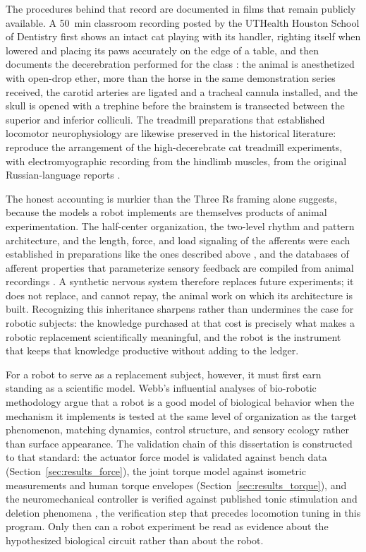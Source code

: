 The procedures behind that record are documented in films that remain publicly available. A \qty{50}{\minute} classroom recording posted by the UTHealth Houston School of Dentistry first shows an intact cat playing with its handler, righting itself when lowered and placing its paws accurately on the edge of a table, and then documents the decerebration performed for the class \citep{utherst_decerebrate_2025}: the animal is anesthetized with open-drop ether, more than the horse in the same demonstration series received, the carotid arteries are ligated and a tracheal cannula installed, and the skull is opened with a trephine before the brainstem is transected between the superior and inferior colliculi. The treadmill preparations that established locomotor neurophysiology are likewise preserved in the historical literature: \citet{stuart_reflections_2007} reproduce the arrangement of the high-decerebrate cat treadmill experiments, with electromyographic recording from the hindlimb muscles, from the original Russian-language reports \citep{severin_1967}.

The honest accounting is murkier than the Three Rs framing alone suggests, because the models a robot implements are themselves products of animal experimentation. The half-center organization, the two-level rhythm and pattern architecture, and the length, force, and load signaling of the afferents were each established in preparations like the ones described above \citep{brown_intrinsic_1911, severin_1967, rybak_modelling_2006}, and the databases of afferent properties that parameterize sensory feedback are compiled from animal recordings \citep{bolen_sensory_2023}. A synthetic nervous system therefore replaces future experiments; it does not replace, and cannot repay, the animal work on which its architecture is built. Recognizing this inheritance sharpens rather than undermines the case for robotic subjects: the knowledge purchased at that cost is precisely what makes a robotic replacement scientifically meaningful, and the robot is the instrument that keeps that knowledge productive without adding to the ledger.

For a robot to serve as a replacement subject, however, it must first earn standing as a scientific model. Webb's influential analyses of bio-robotic methodology \citep{webb_robots_2001, webb_robots_2002} argue that a robot is a good model of biological behavior when the mechanism it implements is tested at the same level of organization as the target phenomenon, matching dynamics, control structure, and sensory ecology rather than surface appearance. The validation chain of this dissertation is constructed to that standard: the actuator force model is validated against bench data (Section~\ref{sec:results_force}), the joint torque model against isometric measurements and human torque envelopes (Section~\ref{sec:results_torque}), and the neuromechanical controller is verified against published tonic stimulation and deletion phenomena \citep{selionov_tonic_2009, rybak_modelling_2006}, the verification step that precedes locomotion tuning in this program. Only then can a robot experiment be read as evidence about the hypothesized biological circuit rather than about the robot.


